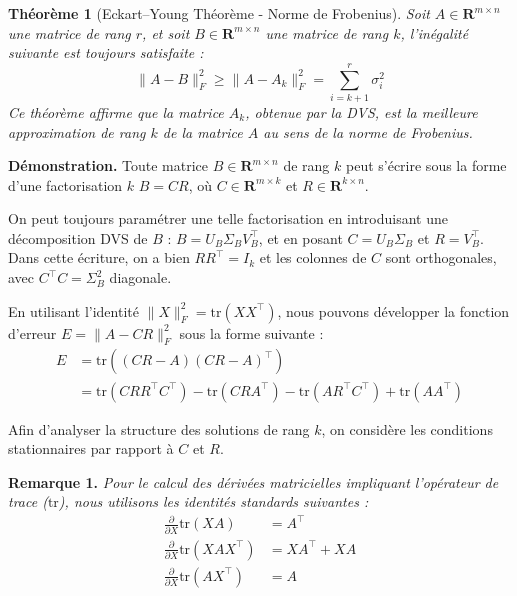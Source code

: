 \documentclass[12pt]{report}
\newtheorem{theorem}{Th\'{e}or\`{e}me}
\begin{document}
\begin{theorem} [Eckart–Young Théorème - Norme de Frobenius] Soit $A \in \mathbf{R}^{m \times n}$ une matrice de rang $r$, et soit $B \in \mathbf{R}^{m \times n}$ une matrice de rang $k$, l'inégalité suivante est toujours satisfaite :
    \begin{equation*}
        \|A - B\|_F^2 \geq \|A - A_k\|_F^2 = \sum_{i=k+1}^{r} \sigma_i^2
    \end{equation*}
    \noindent Ce théorème affirme que la matrice $A_k$, obtenue par la DVS, est la meilleure approximation de rang $k$ de la matrice $A$ au sens de la norme de Frobenius.
\end{theorem}

\noindent \textbf{Démonstration.}
Toute matrice $B \in \mathbf{R}^{m \times n}$ de rang $k$ peut s'écrire sous la forme d'une factorisation $k$ $B = CR$, où $C \in \mathbf{R}^{m \times k}$ et $R \in \mathbf{R}^{k \times n}$.

\noindent On peut toujours paramétrer une telle factorisation en introduisant une décomposition DVS de $B$ :
$B = U_B \Sigma_B V_B^{\top}$, et en posant
$C = U_B \Sigma_B$ et $R = V_B^{\top}$.
Dans cette écriture, on a bien $RR^{\top} = I_k$ et les colonnes de $C$ sont orthogonales, avec
$C^{\top}C = \Sigma_B^2$ diagonale.

\noindent En utilisant l'identité $\|X\|_F^2 = \text{tr}(X X^{\top})$, nous pouvons développer la fonction d'erreur $E = \|A - CR\|_F^2$ sous la forme suivante :
\begin{align}
    E & = \text{tr}\left( (CR - A)(CR - A)^{\top} \right) \nonumber                                                           \\
      & = \text{tr}(C R R^{\top} C^{\top}) - \text{tr}(C R A^{\top}) - \text{tr}(A R^{\top} C^{\top}) + \text{tr}(A A^{\top})
\end{align}

\noindent Afin d'analyser la structure des solutions de rang $k$, on considère les conditions stationnaires par rapport à $C$ et $R$.

\noindent \textbf {Remarque 1.}
\textit{Pour le calcul des dérivées matricielles impliquant l'opérateur de trace ($\text{tr}$), nous utilisons les identités standards suivantes :}
\begin{align*}
    \frac{\partial}{\partial X} \text{tr}(XA)         & = A^{\top}       \\
    \frac{\partial}{\partial X} \text{tr}(XAX^{\top}) & = XA^{\top} + XA \\
    \frac{\partial}{\partial X} \text{tr}(AX^{\top})  & = A
\end{align*}
\\
\end{document}
